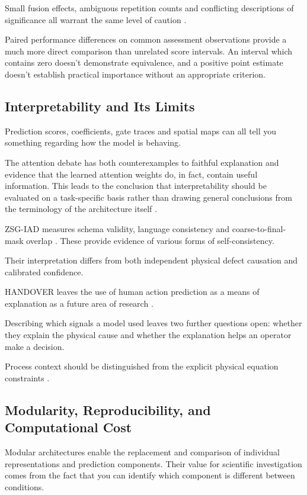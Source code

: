Small fusion effects, ambiguous repetition counts and conflicting descriptions of significance all
warrant the same level of caution \parencite{Gu2024Improved,Xu2025ModalityResilient}.

Paired performance differences on common assessment observations provide a much more direct
comparison than unrelated score intervals. An interval which contains zero doesn't demonstrate
equivalence, and a positive point estimate doesn't establish practical importance without an
appropriate criterion.

\subsection{Interpretability and Its Limits}

Prediction scores, coefficients, gate traces and spatial maps can all tell you something regarding
how the model is behaving.

The attention debate has both counterexamples to faithful explanation and evidence that the learned
attention weights do, in fact, contain useful information. This leads to the conclusion that
interpretability should be evaluated on a task-specific basis rather than drawing general
conclusions from the terminology of the architecture itself \parencite{P036}.

ZSG-IAD measures schema validity, language consistency and coarse-to-final-mask overlap
\parencite{P025}. These provide evidence of various forms of self-consistency.

Their interpretation differs from both independent physical defect causation and calibrated
confidence.

HANDOVER leaves the use of human action prediction as a means of explanation as a future area of
research \parencite{Thoduka2024Handover}.

Describing which signals a model used leaves two further questions open: whether they explain the physical cause and whether the explanation helps an operator make a decision.

Process context should be distinguished from the explicit physical equation constraints \parencite[e.g.,
PGMTKD's pressure model;][]{Li2025PGMTKD}.

\subsection{Modularity, Reproducibility, and Computational Cost}

Modular architectures enable the replacement and comparison of individual representations
and prediction components. Their value for scientific investigation comes from the fact that you
can identify which component is different between conditions.

